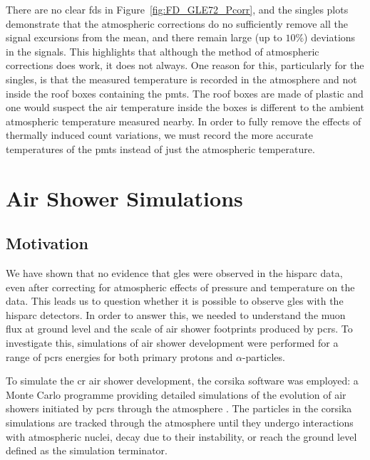 There are no clear \glspl{fd} in Figure~\ref{fig:FD_GLE72_Pcorr}, and the singles plots demonstrate that the atmospheric corrections do no sufficiently remove all the signal excursions from the mean, and there remain large (up to $10\%$) deviations in the signals. This highlights that although the method of atmospheric corrections does work, it does not always. One reason for this, particularly for the singles, is that the measured temperature is recorded in the atmosphere and not inside the roof boxes containing the \glspl{pmt}. The roof boxes are made of plastic and one would suspect the air temperature inside the boxes is different to the ambient atmospheric temperature measured nearby. In order to fully remove the effects of thermally induced count variations, we must record the more accurate temperatures of the \glspl{pmt} instead of just the atmospheric temperature.



\section{Air Shower Simulations}\label{sec:CORSIKA}

\subsection{Motivation}

We have shown that no evidence that \glspl{gle} were observed in the \gls{hisparc} data, even after correcting for atmospheric effects of pressure and temperature on the data. This leads us to question whether it is possible to observe \glspl{gle} with the \gls{hisparc} detectors. In order to answer this, we needed to understand the muon flux at ground level and the scale of air shower footprints produced by \glspl{pcr}. To investigate this, simulations of air shower development were performed for a range of \glspl{pcr} energies for both primary protons and $\alpha$-particles. 

To simulate the \gls{cr} air shower development, the \gls{corsika} software was employed: a Monte Carlo programme providing detailed simulations of the evolution of air showers initiated by \glspl{pcr} through the atmosphere \citep{heck_extensive_2017}. The particles in the \gls{corsika} simulations are tracked through the atmosphere until they undergo interactions with atmospheric nuclei, decay due to their instability, or reach the ground level defined as the simulation terminator.

